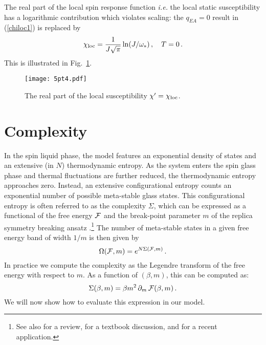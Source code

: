 \documentclass[aps,prx,preprint,onecolumn,citeautoscript,superscriptaddress,nofootinbib,
eqsecnum]{revtex4}
\newcommand{\beq}{\begin{equation}}
\newcommand{\eeq}{\end{equation}}
\begin{document}
{The real part of the local spin response function {\it i.e.\/} the local static susceptibility has a logarithmic contribution which violates scaling: the $q_{EA} = 0$ result in (\ref{chiloc1}) is replaced by
\beq
\chi_{\rm loc} = \frac{1}{ J \sqrt{\pi}} \ln (J/\omega_\ast) \,, \quad T=0 \,. \label{chiloc2}
\eeq
This is illustrated in Fig.~\ref{fig:log}.
\begin{figure}
\begin{center}
\texttt{[image: 5pt4.pdf]}
\end{center}
\caption{The real part of the local susceptibility $\chi' = \chi_{\rm loc}$.}
\label{fig:log}
\end{figure}



\section{Complexity}
\label{sec:complexity}

In the spin liquid phase, the model features an exponential density of states and an extensive (in $N$) thermodynamic entropy.
As the system enters the spin glass phase and thermal fluctuations are further reduced, the thermodynamic entropy approaches zero. Instead, an extensive configurational entropy counts an exponential number of possible meta-stable glass states. This configurational entropy is often referred to as the complexity $\Sigma$, which can be expressed as a functional of the free energy ${\cal F}$ and the break-point parameter $m$ of the replica symmetry breaking ansatz \cite{monasson1995structural,Franz_1998,Mezard_1999}.\footnote{ See also \cite{zamponi2010mean} for a review, \cite{de2006random} for a textbook discussion, and \cite{Anous:2021eqj} for a recent application.} The number of meta-stable states in a given free energy band of width $1/m$ is then given by 
\begin{equation}
  \Omega({\cal F},m) = e^{N\Sigma({\cal F},m)} \,.
\end{equation}
In practice we compute the complexity as the Legendre transform of the free energy with respect to $m$. As a function of $(\beta,m)$, this can be computed as:
\begin{equation}
\label{eq:SigmaDefCalc}
 \Sigma(\beta,m)   = \beta m^2\, \partial_{m}  \,{\cal F}(\beta,m) \,.
 \end{equation}
We will now show how to evaluate this expression in our model. 

}
\end{document}
